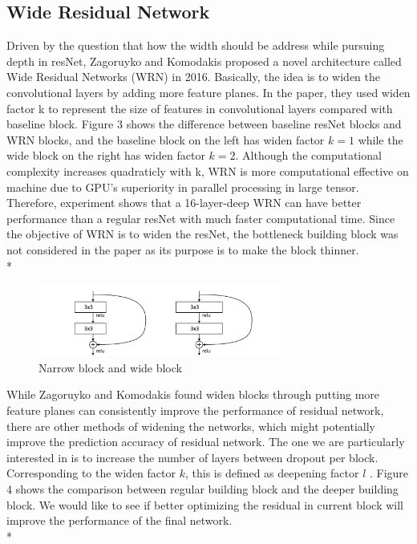\documentclass{article} %
\begin{document}
\subsection{Wide Residual Network}

Driven by the question that how the width should be address while pursuing depth in resNet, Zagoruyko and Komodakis \cite{zagoruyko2016wide} proposed a novel architecture called Wide Residual Networks (WRN) in 2016. Basically, the idea is to widen the convolutional layers by adding more feature planes. In the paper, they used widen factor k to represent the size of features in convolutional layers compared with baseline block. Figure 3 shows the difference between baseline resNet blocks and WRN blocks, and the baseline block on the left has widen factor $k = 1$ while the wide block on the right has widen factor $k = 2$. Although the computational complexity increases quadraticly with k, WRN is more computational effective on machine due to GPU's superiority in parallel processing in large tensor. Therefore, experiment shows that a 16-layer-deep WRN can have better performance than a regular resNet with much faster computational time. Since the objective of WRN is to widen the resNet, the bottleneck building block was not considered in the paper as its purpose is to make the block thinner. \\*

 \begin{figure}[h]
\centering
\includegraphics[width=8cm]{wideblock}
 \caption{Narrow block and wide block}
\end{figure}

While Zagoruyko and Komodakis found widen blocks through putting more feature planes can consistently improve the performance of residual network, there are other methods of widening the networks, which might potentially improve the prediction accuracy of residual network. The one we are particularly interested in is to increase the number of layers between dropout per block. Corresponding to the widen factor $k$, this is defined as deepening factor $l$  \cite{zagoruyko2016wide}. Figure 4 shows the comparison between regular building block and the deeper building block. We would like to see if better optimizing the residual in current block will improve the performance of the final network. \\* 
\end{document}
